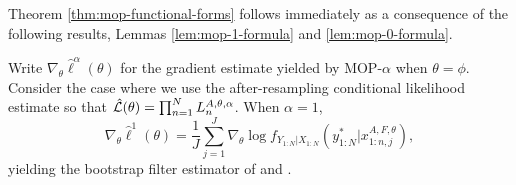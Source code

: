 

Theorem \ref{thm:mop-functional-forms} follows immediately as a consequence of the following results, Lemmas \ref{lem:mop-1-formula} and \ref{lem:mop-0-formula}.

\begin{lem}
    \label{lem:mop-1-formula}
    Write $\nabla_\theta \hat\ell^\alpha(\theta)$ for the gradient estimate yielded by MOP-$\alpha$ when $\theta=\phi$. Consider the case where we use the after-resampling conditional likelihood estimate so that $\hat{\mathcal{L}}(\theta) = \prod_{n=1}^N L_n^{A, \theta, \alpha}$. When $\alpha=1$,
    \begin{equation}
        \nabla_\theta \hat{\ell}^1(\theta) 
        = \frac{1}{J}\sum_{j=1}^J \nabla_\theta \log f_{Y_{1:N}|X_{1:N}}\left(y_{1:N}^* | x_{1:n,j}^{A, F,\theta}\right),
    \end{equation}
    yielding the bootstrap filter estimator of \cite{poyiadjis11} and \cite{scibior21}.
\end{lem}

